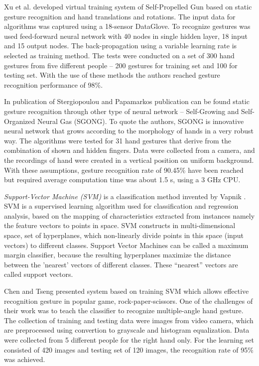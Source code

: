 Xu et al. \cite{conf/icat/XuYZ06} developed virtual training system of Self-Propelled Gun based on static gesture recognition and hand translations and rotations. The input data for algorithms was captured using a 18-sensor DataGlove. To recognize gestures was used feed-forward neural network with 40 nodes in single hidden layer, 18 input and 15 output nodes. The back-propagation using a variable learning rate is selected as training method. The tests were conducted on a set of 300 hand gestures from five different people -- 200 gestures for training set and 100 for testing set. With the use of these methods the authors reached gesture recognition performance of 98\%.

In publication of Stergiopoulou and Papamarkos publication \cite {Stergiopoulou:2009:HGR:1651923.1651954} can be found static gesture recognition through other type of neural network -- Self-Growing and Self-Organized Neural Gas (SGONG). To quote the authors, SGONG is innovative neural network that grows according to the morphology of hands in a very robust way. The algorithms were tested for 31 hand gestures that derive from the combination of shown and hidden fingers. Data were collected from a camera, and the recordings of hand were created in a vertical position on uniform background. With these assumptions, gesture recognition rate of 90.45\% have been reached but required average computation time was about 1.5 s, using a 3 GHz CPU.

\emph{Support-Vector Machine (SVM)} is a classification method invented by Vapnik \cite{Cortes:SVM}. SVM is a supervised learning algorithm used for classification and regression analysis, based on the mapping of characteristics extracted from instances namely the feature vectors to points in space. SVM constructs in multi-dimensional space, set of hyperplanes, which non-linearly divide points in this space (input vectors) to different classes. Support Vector Machines can be called a maximum margin classifier, because the resulting hyperplanes maximize the distance between the ’nearest’ vectors of different classes. These ``nearest'' vectors are called support vectors.

Chen and Tseng \cite{ChenDeveloping} presented system based on training SVM which allows effective recognition gesture in popular game, rock-paper-scissors. One of the challenges of their work was to teach the classifier to recognize multiple-angle hand gesture. The collection of training and testing data were images from video camera, which are preprocessed using convertion to grayscale and histogram equalization. Data were collected from 5 different people for the right hand only. For the learning set consisted of 420 images and testing set of 120 images, the recognition rate of 95\% was achieved.

